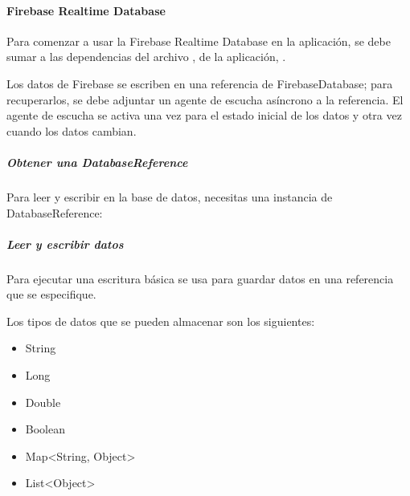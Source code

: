 \paragraph{Firebase Realtime Database}
\label{\detokenize{dev_docs:firebase-realtime-database}}
Para comenzar a usar la Firebase Realtime Database en la aplicación,
se debe sumar a las dependencias del archivo , de la aplicación,
.

Los datos de Firebase se escriben en una referencia de FirebaseDatabase;
para recuperarlos, se debe adjuntar un agente de escucha asíncrono a la
referencia. El agente de escucha se activa una vez para el estado inicial de los
datos y otra vez cuando los datos cambian.


\subparagraph{Obtener una DatabaseReference}
\label{\detokenize{dev_docs:obtener-una-databasereference}}
Para leer y escribir en la base de datos, necesitas una instancia de
DatabaseReference:

%
\begin{sphinxVerbatim}[commandchars=\\\{\}]
  
  
\end{sphinxVerbatim}


\subparagraph{Leer y escribir datos}
\label{\detokenize{dev_docs:leer-y-escribir-datos}}
Para ejecutar una escritura básica se usa  para guardar datos en
una referencia que se especifique.

Los tipos de datos que se pueden almacenar son los siguientes:
\begin{itemize}
\item {} 
String

\item {} 
Long

\item {} 
Double

\item {} 
Boolean

\item {} 
Map\textless{}String, Object\textgreater{}

\item {} 
List\textless{}Object\textgreater{}

\end{itemize}


